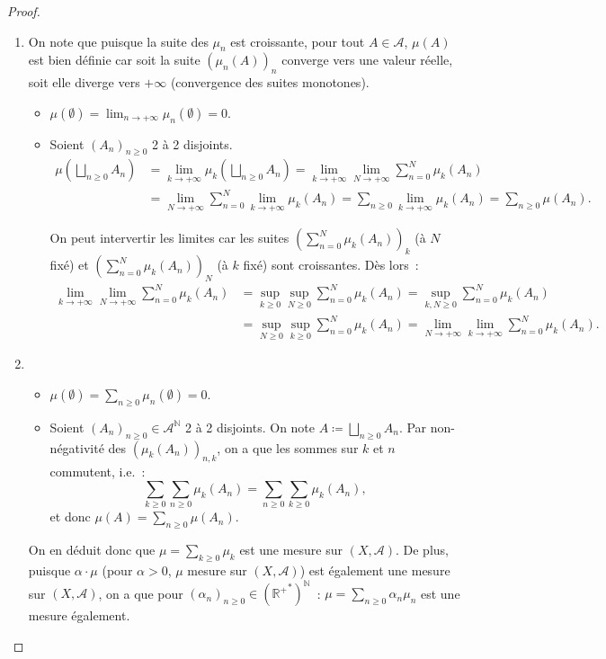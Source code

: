 \documentclass{article}
\newcommand{\pinfty}{{+\infty}}
\newcommand{\N}{{\mathbb N}}
\newcommand{\R}{{\mathbb R}}
\begin{document}
\begin{proof}~
\begin{enumerate}
	\item On note que puisque la suite des $\mu_n$ est croissante, pour tout $A \in \mathcal A$, $\mu(A)$ est bien définie car soit la suite $(\mu_n(A))_n$ converge vers une
	valeur réelle, soit elle diverge vers $\pinfty$ (convergence des suites monotones).
	\begin{itemize}
		\item $\mu(\emptyset) = \lim_{n \to \pinfty}\mu_n(\emptyset) = 0$.
		\item Soient $(A_n)_{n \geq 0}$ 2 à 2 disjoints.
		\begin{align*}
			\mu\left(\bigsqcup_{n \geq 0}A_n\right) &= \lim_{k \to \pinfty}\mu_k\left(\bigsqcup_{n \geq 0}A_n\right) = \lim_{k \to \pinfty}\lim_{N \to \pinfty}\sum_{n=0}^N\mu_k(A_n) \\
				&= \lim_{N \to \pinfty}\sum_{n=0}^N\lim_{k \to \pinfty}\mu_k(A_n) = \sum_{n \geq 0}\lim_{k \to \pinfty}\mu_k(A_n) = \sum_{n \geq 0}\mu(A_n).
		\end{align*}

		On peut intervertir les limites car les suites $(\sum_{n=0}^N\mu_k(A_n))_k$ (à $N$ fixé) et $(\sum_{n=0}^N\mu_k(A_n))_N$ (à $k$ fixé) sont croissantes. Dès lors~:
		\begin{align*}
			\lim_{k \to \pinfty}\lim_{N \to \pinfty}\sum_{n=0}^N\mu_k(A_n) &= \sup_{k \geq 0}\sup_{N \geq 0}\sum_{n=0}^N\mu_k(A_n) = \sup_{k, N \geq 0}\sum_{n=0}^N\mu_k(A_n) \\
				&= \sup_{N \geq 0}\sup_{k \geq 0}\sum_{n=0}^N\mu_k(A_n) = \lim_{N \to \pinfty}\lim_{k \to \pinfty}\sum_{n=0}^N\mu_k(A_n).
		\end{align*}
	\end{itemize}
	\item~
	\begin{itemize}
		\item $\mu(\emptyset) = \sum_{n \geq 0}\mu_n(\emptyset) = 0$.
		\item Soient $(A_n)_{n \geq 0} \in \mathcal A^\N$ 2 à 2 disjoints. On note $A \coloneqq \bigsqcup_{n \geq 0}A_n$. Par non-négativité des $(\mu_k(A_n))_{n,k}$,
		on a que les sommes sur $k$ et $n$ commutent, i.e.~:
		\[\sum_{k \geq 0}\sum_{n \geq 0}\mu_k(A_n) = \sum_{n \geq 0}\sum_{k \geq 0}\mu_k(A_n),\]
		et donc $\mu(A) = \sum_{n \geq 0}\mu(A_n)$.
	\end{itemize}
	On en déduit donc que $\mu = \sum_{k \geq 0}\mu_k$ est une mesure sur $(X, \mathcal A)$. De plus, puisque $\alpha \cdot \mu$ (pour $\alpha > 0$, $\mu$ mesure sur $(X, \mathcal A)$)
	est également une mesure sur $(X, \mathcal A)$, on a que pour $(\alpha_n)_{n \geq 0} \in \left({\R^+}^*\right)^\N$~: $\mu = \sum_{n \geq 0}\alpha_n\mu_n$ est une mesure également.


\end{enumerate}
\end{proof}
\end{document}
